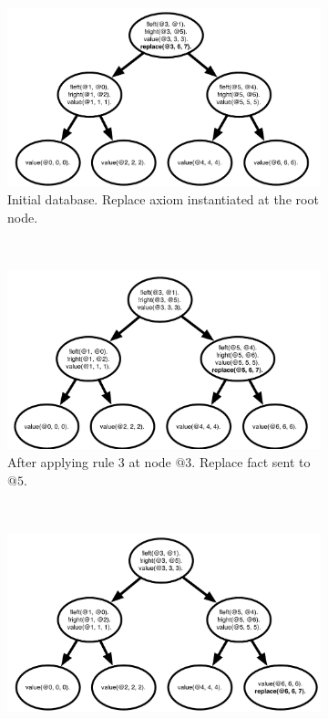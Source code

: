 \begin{figure}[]
        \centering
        \begin{subfigure}[b]{0.5\textwidth}
                \includegraphics[width=\textwidth]{btree_trace1}
                \caption{Initial database. Replace axiom instantiated at the root node.}
                \label{fig:btree_trace1}
        \end{subfigure}%
        ~
        \begin{subfigure}[b]{0.5\textwidth}
                \includegraphics[width=\textwidth]{btree_trace2}
                \caption{After applying rule 3 at node $@3$. Replace fact sent to $@5$.}
                \label{fig:btree_trace2}
        \end{subfigure}\\
        \begin{subfigure}[b]{0.5\textwidth}
                \includegraphics[width=\textwidth]{btree_trace3}

\end{subfigure}
\end{figure}

